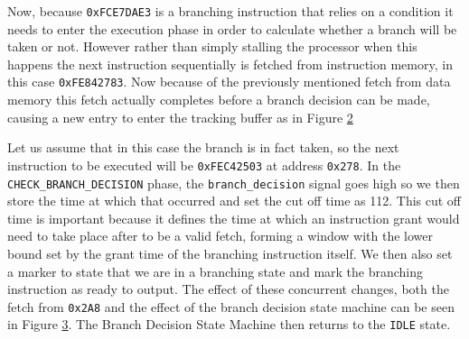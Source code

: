 \begin{figure}[htbp]
	\begin{subfigure}{\linewidth}
		
	\end{subfigure}
	\begin{subfigure}{\linewidth}
		
	\end{subfigure}
	\caption{}
	\label{fig:complex-example-step-1}
\end{figure} 

Now, because \texttt{0xFCE7DAE3} is a branching instruction that relies on a condition it needs to enter the execution phase in order to calculate whether a branch will be taken or not. However rather than simply stalling the processor when this happens the next instruction sequentially is fetched from instruction memory, in this case \texttt{0xFE842783}. Now because of the previously mentioned fetch from data memory this fetch actually completes before a branch decision can be made, causing a new entry to enter the tracking buffer as in Figure \ref{fig:complex-example-step-2}

\begin{figure}[htbp]
	
	\caption{}
	\label{fig:complex-example-step-2}
\end{figure} 


Let us assume that in this case the branch is in fact taken, so the next instruction to be executed will be \texttt{0xFEC42503} at address \texttt{0x278}. In the \texttt{CHECK\_BRANCH\_DECISION} phase, the \texttt{branch\_decision} signal goes high so we then store the time at which that occurred and set the cut off time as 112. This cut off time is important because it defines the time at which an instruction grant would need to take place after to be a valid fetch, forming a window with the lower bound set by the grant time of the branching instruction itself. We then also set a marker to state that we are in a branching state and mark the branching instruction as ready to output. The effect of these concurrent changes, both the fetch from \texttt{0x2A8} and the effect of the branch decision state machine can be seen in Figure \ref{fig:complex-example-step-3}. The Branch Decision State Machine then returns to the \texttt{IDLE} state.

\begin{figure}[htbp]
	\begin{subfigure}{\linewidth}
		
	\end{subfigure}
	\begin{subfigure}{\linewidth}
		
	\end{subfigure}
	\caption{}
	\label{fig:complex-example-step-3}
\end{figure} 


